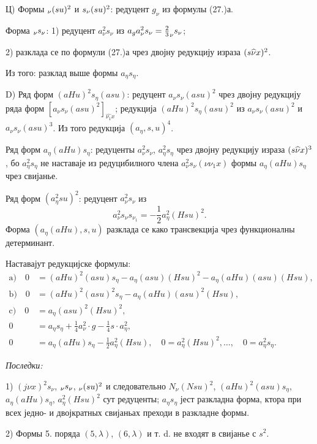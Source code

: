 ﻿\documentclass[11pt]{article}
\let\A\relax
\newcommand{\A}{\mathfrak A}
\begin{document}
Ц) Формы $\A_{\nu}(\A su)^2$ и $s_{\nu}(\A su)^2$: редуцент $g_{\nu}$ из формулы (27.)а.

Форма $\A_{\nu}s_{\nu}$: 1) редуцент $a_{\nu}^2s_{\nu}$ из $a_ga_{\nu}^2s_{\nu}=\frac23\A_{\nu}s_{\nu}$;

2) разклада се по формули (27.)а чрез двојну редукцију израза $(\A s\widehat{\nu}x)^2$.

Из того: разклад выше формы $a_\eta s_\eta$.

D) Ряд форм $(aHu)^2s_\eta(asu)$: редуцент $a_{\nu}s_{\nu}(asu)^2$ чрез двојну редукцију ряда форм $[a_{\nu}s_{\nu}(asu)^2]_{\widehat{\nu_1}x}$; редукција $(aHu)^2s_\eta(asu)^2$ из $a_{\nu}s_{\nu}(asu)^2$ и $a_{\nu}s_{\nu}(asu)^3$. Из того редукција $(a_\eta,s,u)^4$.

Ряд форм $a_\eta(aHu)s_\eta$: редуценты $a_{\nu}^2s_{\nu}$, $a_\eta^2s_\eta$ чрез двојну редукцију израза $(\A s\widehat{\nu}x)^3$, бо $a_\eta^2s_\eta$ не наставаје из редуцибилного члена $a_{\nu}^2s_{\nu}(\nu\nu_1x)$ формы $a_\eta(aHu)s_\eta$ чрез свијанье.

Ряд форм $(a_\eta^2su)^2$: редуцент $a_{\nu}^2s_{\nu}$ из
\[
a_{\nu}^2s_{\nu}s_{\nu_1}=-\frac12a_\eta^2(Hsu)^2.
\]
Форма $(a_\eta(aHu),s,u)$ разклада се како трансвекција чрез функционалны детерминант.

Наставајут редукцијске формулы:
\[
\tag{30}
\begin{aligned}
\mathrm{a)}\quad 0&=(aHu)^2(asu)s_\eta-a_\eta(asu)(Hsu)^2-a_\eta(aHu)(asu)(Hsu),\\
\mathrm{b)}\quad 0&=(aHu)^2(asu)^2s_\eta-a_\eta(aHu)(asu)^2(Hsu),\\
\mathrm{c)}\quad 0&=a_\eta(asu)^2(Hsu)^2,\\
0&=a_\eta s_\eta+\frac14a_{\nu}^2\cdot g-\frac14s\cdot a_\eta^2,\\
0&=a_\eta(aHu)s_\eta-\frac12a_\eta^2(Hsu),
\quad 0=a_\eta^2(Hsu)^2,\ldots,
\quad 0=a_\eta^2s_\eta.
\end{aligned}
\]

\noindent\textit{Последки:}

1) $(j\nu x)^2s_{\nu}$, $\A_{\nu}s_{\nu}$, $\A_{\nu}(\A su)^2$ и следовательно $N_{\nu}(Nsu)^2$, $(aHu)^2(asu)s_\eta$, $a_\eta(aHu)s_\eta$, $a_\eta^2(Hsu)^2$ сут редуценты; $a_\eta s_\eta$ јест разкладна форма, ктора при всех једно- и двојкратных свијаньах преходи в разкладне формы.

2) Формы 5. поряда $(5,\lambda)$, $(6,\lambda)$ и т. d. не входят в свијанье с $s^2$.
\end{document}
